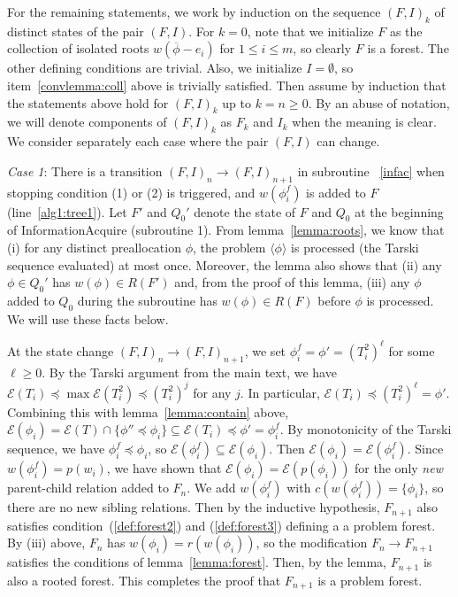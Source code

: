 \documentclass[11pt,reqno]{amsart}
\theoremstyle{definition}
\numberwithin{equation}{section}
\newcommand{\ol}{\overline}
\newcommand{\lag}{\langle}
\newcommand{\rag}{\rangle}
\newcommand{\pre}{\phi}
\newcommand{\sub}{\subseteq}
\newcommand{\fix}{\mathcal{E}}
\newcommand{\peq}{\preceq}
\newcommand{\toppre}{\ol{\pre}}
\newcommand{\acto}{Q_0}
\newcommand{\coll}{I}
\newcommand{\forest}{F}
\newcommand{\pair}{(F,I)}
\newcommand{\roott}{R}
\begin{document}
For the remaining statements, we work by induction on the sequence $\pair_k$ of distinct states of the pair $\pair$. 
For $k = 0$, note that we initialize $F$ as the collection of isolated roots $w(\toppre - e_i)$ for $1 \leq i \leq m$, so clearly $F$ is a forest.
The other defining conditions are trivial.
Also, we initialize $\coll = \emptyset$, so item~\ref{convlemma:coll} above is trivially satisfied. 
Then assume by induction that the statements above hold for $\pair_k$ up to $k = n \geq 0$. 
By an abuse of notation, we will denote components of $\pair_k$ as $\forest_k$ and $\coll_k$ when the meaning is clear.
We consider separately each case where the pair $\pair$ can change.

\emph{Case 1}: There is a transition $\pair_n \to \pair_{n +1}$ in subroutine ~\ref{infac} when stopping condition (1) or (2) is triggered, and $w(\pre_i^f)$ is added to $\forest$ (line~\ref{alg1:tree1}). 
Let $\forest'$ and $\acto'$ denote the state of $\forest$ and $\acto$ at the beginning of InformationAcquire (subroutine 1).
From lemma~\ref{lemma:roots}, we know that (i) for any distinct preallocation $\pre$, the problem $\lag \pre \rag$ is processed (the Tarski sequence evaluated) at most once.
Moreover, the lemma also shows that (ii) any $\pre \in \acto'$ has $w(\pre) \in \roott(\forest')$ and, from the proof of this lemma, (iii) any $\pre$ added to $\acto$ during the subroutine has $w(\pre) \in \roott(\forest)$ before $\pre$ is processed. 
We will use these facts below. 

At the state change $\pair_n \to \pair_{n + 1}$, we set $\pre_i^f = \pre' = (T_i^2)^{\ell}$ for some $\ell \geq 0$.
By the Tarski argument from the main text, we have $\fix(T_i) \peq \max \fix(T_i^2) \peq (T_i^2)^{j}$ for any $j$. 
In particular, $\fix(T_i) \peq (T_i^2)^{\ell} = \pre'$.
Combining this with lemma~\ref{lemma:contain} above, $\fix(\pre_i) = \fix(T) \cap \{\pre'' \peq \pre_i\} \sub \fix(T_i) \peq \pre' = \pre_i^f$. 
By monotonicity of the Tarski sequence, we have $\pre_i^f \peq \pre_i$, so $\fix(\pre_i^f) \sub \fix(\pre_i)$. 
Then $\fix(\pre_i) = \fix(\pre_i^f)$.
Since $w(\pre_i^f) = p(w_i)$, we have shown that $\fix(\pre_i) = \fix(p(\pre_i))$ for the only \emph{new} parent-child relation added to $\forest_n$. 
We add $w(\pre_i^f)$ with $c(w(\pre_i^f)) = \{\pre_i\}$, so there are no new sibling relations. 
Then by the inductive hypothesis, $\forest_{n+1}$ also satisfies condition~(\ref{def:forest2}) and (\ref{def:forest3}) defining a a problem forest.
By (iii) above, $\forest_n$ has $w(\pre_i) = r(w(\pre_i))$, so the modification $\forest_n \to \forest_{n + 1}$ satisfies the conditions of lemma~\ref{lemma:forest}.
Then, by the lemma, $\forest_{n + 1}$ is also a rooted forest. 
This completes the proof that $\forest_{n + 1}$ is a problem forest.
\end{document}
